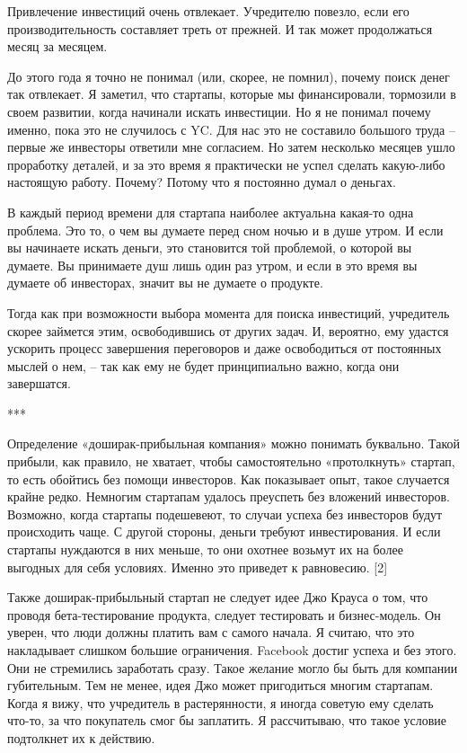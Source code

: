 \documentclass[ebook,12pt,oneside,openany]{memoir}
\begin{document}
Привлечение инвестиций очень отвлекает. Учредителю повезло, если его
производительность составляет треть от прежней. И так может
продолжаться месяц за месяцем.

До этого года я точно не понимал (или, скорее, не помнил), почему
поиск денег так отвлекает. Я заметил, что стартапы, которые мы
финансировали, тормозили в своем развитии, когда начинали искать
инвестиции. Но я не понимал почему именно, пока это не случилось с YC.
Для нас это не составило большого труда – первые же инвесторы ответили
мне согласием. Но затем несколько месяцев ушло проработку деталей, и
за это время я практически не успел сделать какую-либо настоящую
работу. Почему? Потому что я постоянно думал о деньгах.

В каждый период времени для стартапа наиболее актуальна какая-то одна
проблема. Это то, о чем вы думаете перед сном ночью и в душе утром. И
если вы начинаете искать деньги, это становится той проблемой, о
которой вы думаете. Вы принимаете душ лишь один раз утром, и если в
это время вы думаете об инвесторах, значит вы не думаете о продукте.

Тогда как при возможности выбора момента для поиска инвестиций,
учредитель скорее займется этим, освободившись от других задач. И,
вероятно, ему удастся ускорить процесс завершения переговоров и даже
освободиться от постоянных мыслей о нем, – так как ему не будет
принципиально важно, когда они завершатся.

***

Определение «доширак-прибыльная компания» можно понимать буквально.
Такой прибыли, как правило, не хватает, чтобы самостоятельно
«протолкнуть» стартап, то есть обойтись без помощи инвесторов. Как
показывает опыт, такое случается крайне редко. Немногим стартапам
удалось преуспеть без вложений инвесторов. Возможно, когда стартапы
подешевеют, то случаи успеха без инвесторов будут происходить чаще. С
другой стороны, деньги требуют инвестирования. И если стартапы
нуждаются в них меньше, то они охотнее возьмут их на более выгодных
для себя условиях. Именно это приведет к равновесию. [2]

Также доширак-прибыльный стартап не следует идее Джо Крауса о том, что
проводя бета-тестирование продукта, следует тестировать и
бизнес-модель. Он уверен, что люди должны платить вам с самого начала.
Я считаю, что это накладывает слишком большие ограничения. Facebook
достиг успеха и без этого. Они не стремились заработать сразу. Такое
желание могло бы быть для компании губительным. Тем не менее, идея Джо
может пригодиться многим стартапам. Когда я вижу, что учредитель в
растерянности, я иногда советую ему сделать что-то, за что покупатель
смог бы заплатить. Я рассчитываю, что такое условие подтолкнет их к
действию.
\end{document}
